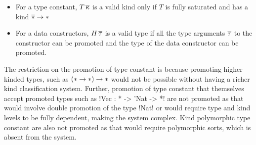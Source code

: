 \documentclass[screen,nonacm]{acmart}
\begin{document}
\begin{itemize}
\item For a type constant, $T\,\overline{\kappa}$ is a valid kind only if $T$ is fully saturated and has a kind $\overline{\ast} \to \ast$
\item For a data constructors, $H\,\overline{\tau}$ is a valid type if all the type arguments $\overline{\tau}$ to the constructor can be promoted and the type of the data constructor can be promoted.
\end{itemize}

The restriction on the promotion of type constant is because promoting higher kinded types, such as $(\ast \to \ast) \to \ast$ would not be possible without having a richer kind classification system. Further, promotion of type constant that themselves accept promoted types such as !Vec : * -> 'Nat -> *! are not promoted as that would involve double promotion of the type !Nat! or would require type and kind levels to be fully dependent, making the system complex. Kind polymorphic type constant are also not promoted as that would require polymorphic sorts, which is absent from the system.

\newcommand\KCoTAppK{
 \ib{\irule[\trule{co-$\tau\kappa$-app}]
 {\Kinding \TEnv {\kappa} {\square}}
 {\CoKinding \TEnv {\Co} {\tau \sim \tau'}};
 {\CoKinding \TEnv {\Co\App\kappa} {\tau\App\kappa \sim \tau'\App\kappa}}
 }
}

\newcommand\KCoKAbs{
 \ib{\irule[\trule{co-$\kappa$-abs}]
 {\Kinding \TEnv {\kappa} {\square}}
 {\CoKinding \TEnv {\Co} {\tau \sim \tau'}};
 {\CoKinding \TEnv {\Forall \kappa \Co} {\Forall \kappa \tau \sim {\Forall \kappa \tau'}}}
 }
}

\newcommand\KCoVarAx{
 \ib{\irule[\trule{co-$\Co$-ax}]
   {\substack {\mathlarger{c\co \Forall{\many\chi}{\Forall{\many{\alpha\co\eta}}{\tau'\sim\tau''}} \in \TEnv}\\
              {\mathlarger\Subst_\kappa = \Set{\many{\chi \mapsto \kappa}},
                \Subst_\tau=\Set{\many{\alpha\mapsto\tau}},
                \Subst_\sigma=\Set{\many{\alpha\mapsto\sigma}}}}}
   {\substack{\mathlarger{\many{\CoKinding \TEnv \Co {\tau\sim\sigma}}}\\
             {\mathlarger{\many{\CoKinding \TEnv {\tau, \sigma} {\Subst_\kappa\eta}}}}}};
 {\CoKinding \TEnv {c\App\many\kappa\App\many\Co} {\Subst_\kappa\Subst_\tau\tau' \sim \Subst_\kappa\Subst_\sigma\tau''}}
 }
}

\newcommand\KCoKappaInst{
 \ib{\irule[\trule{co-$\kappa$-inst}]
 {\Subst = \Set{\chi \mapsto \kappa}}{\Kinding \TEnv \kappa \square}
 {\CoKinding \TEnv {\Co} {\Forall\chi\tau \sim \Forall\chi{\tau'}}};
 {\CoKinding \TEnv {\Co[\kappa]} {\Subst\tau \sim \Subst\tau'}}
 }
}
\end{document}
